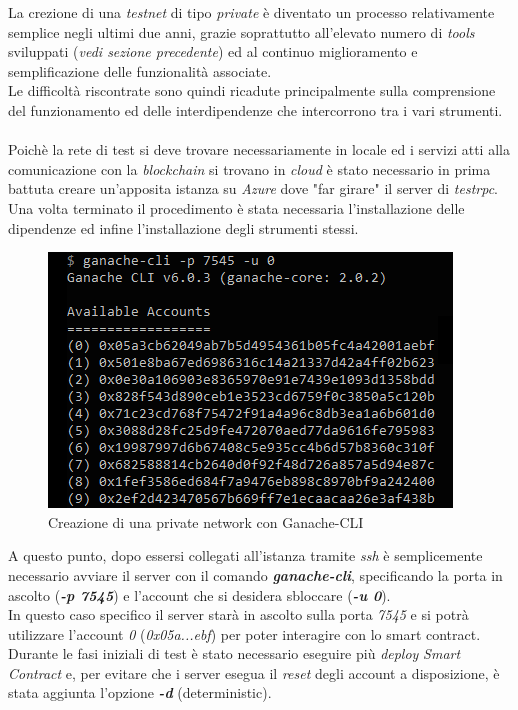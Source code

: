 \documentclass[11pt]{thesistemp}
\begin{document}
La crezione di una \textit{testnet} di tipo \textit{private} è diventato un processo relativamente semplice negli ultimi due anni, grazie soprattutto all'elevato numero di \textit{tools} sviluppati (\textit{vedi sezione precedente}) ed al continuo miglioramento e semplificazione delle funzionalità associate.\\
Le difficoltà riscontrate sono quindi ricadute principalmente sulla comprensione del funzionamento ed delle interdipendenze che intercorrono tra i vari strumenti.\\\\
Poichè la rete di test si deve trovare necessariamente in locale ed i servizi atti alla comunicazione con la \textit{blockchain} si trovano in \textit{cloud} è stato necessario in prima battuta creare un'apposita istanza su \textit{Azure} dove "far girare" il server di \textit{testrpc}.\\
Una volta terminato il procedimento è stata necessaria l'installazione delle dipendenze ed infine l'installazione degli strumenti stessi.\\
\begin{figure}[h]
    \centering
    \includegraphics[scale=0.7]{ganache-cli.png}
        \caption{Creazione di una private network con Ganache-CLI}
    \label{fig:ganache-cli}
\end{figure}
\linebreak
A questo punto, dopo essersi collegati all'istanza tramite \textit{ssh} è semplicemente necessario avviare il server con il comando \textbf{\textit{ganache-cli}}, specificando la porta in ascolto (\textbf{\textit{-p 7545}}) e l'account che si desidera sbloccare (\textbf{\textit{-u 0}}).\\
In questo caso specifico il server starà in ascolto sulla porta \textit{7545} e si potrà utilizzare l'account \textit{0} (\textit{0x05a...ebf}) per poter interagire con lo smart contract.\\
Durante le fasi iniziali di test è stato necessario eseguire più \textit{deploy} \textit{Smart Contract} e, per evitare che i server esegua il \textit{reset} degli account a disposizione, è stata aggiunta l'opzione \textbf{\textit{-d}} (deterministic).
\end{document}
